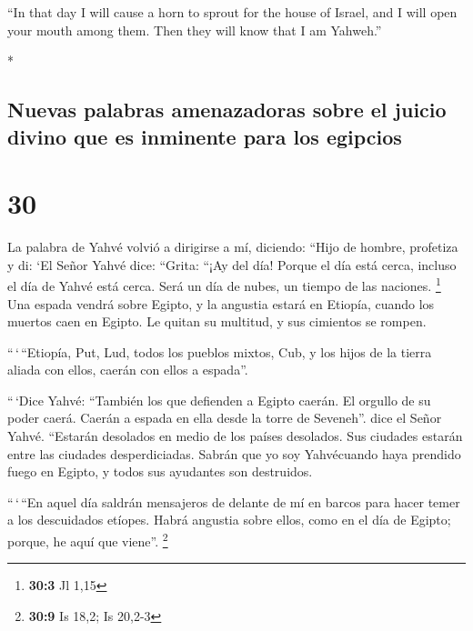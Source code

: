 \begin{paracol}{2}
\begin{otherlanguage}{english}
 ``In that day I will cause a horn to sprout for the
house of Israel, and I will open your mouth among them. Then they will
know that I am Yahweh.''

\end{otherlanguage}

\switchcolumn[0]*

\hypertarget{nuevas-palabras-amenazadoras-sobre-el-juicio-divino-que-es-inminente-para-los-egipcios}{%
\subsection{Nuevas palabras amenazadoras sobre el juicio divino que es
inminente para los
egipcios}\label{nuevas-palabras-amenazadoras-sobre-el-juicio-divino-que-es-inminente-para-los-egipcios}}

\hypertarget{section-58}{%
\section{30}\label{section-58}}

 La palabra de Yahvé volvió a dirigirse a mí, diciendo:
 ``Hijo de hombre, profetiza y di: `El Señor Yahvé dice:
``Grita: ``¡Ay del día!  Porque el día está cerca, incluso
el día de Yahvé está cerca. Será un día de nubes, un tiempo de las
naciones. \footnote{\textbf{30:3} Jl 1,15}  Una espada
vendrá sobre Egipto, y la angustia estará en Etiopía, cuando los muertos
caen en Egipto. Le quitan su multitud, y sus cimientos se rompen.

 ``\,`\,``Etiopía, Put, Lud, todos los pueblos mixtos,
Cub, y los hijos de la tierra aliada con ellos, caerán con ellos a
espada''.

 ``\,`Dice Yahvé: ``También los que defienden a Egipto
caerán. El orgullo de su poder caerá. Caerán a espada en ella desde la
torre de Seveneh''. dice el Señor Yahvé.  ``Estarán
desolados en medio de los países desolados. Sus ciudades estarán entre
las ciudades desperdiciadas.  Sabrán que yo soy
Yahvécuando haya prendido fuego en Egipto, y todos sus ayudantes son
destruidos.

 ``\,`\,``En aquel día saldrán mensajeros de delante de mí
en barcos para hacer temer a los descuidados etíopes. Habrá angustia
sobre ellos, como en el día de Egipto; porque, he aquí que viene''.
\footnote{\textbf{30:9} Is 18,2; Is 20,2-3}

\hypertarget{el-desastre-llega-para-egipto-a-travuxe9s-de-nabucodonosor}{%
}
\end{paracol}

